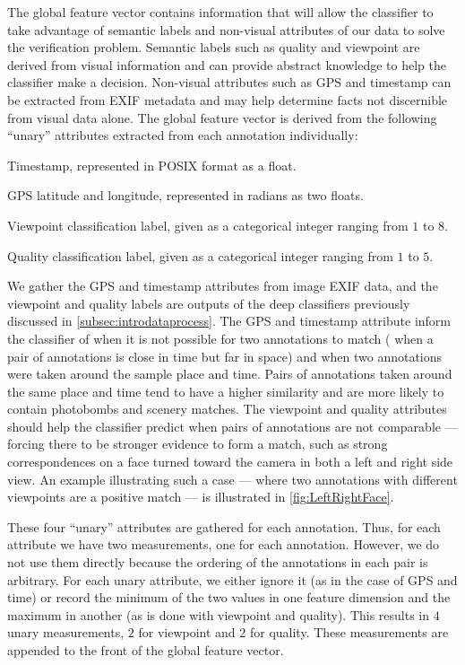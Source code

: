 The global feature vector contains information that will allow the classifier to take advantage of semantic
  labels and non-visual attributes of our data to solve the verification problem.
Semantic labels such as quality and viewpoint are derived from visual information and can provide abstract
  knowledge to help the classifier make a decision.
Non-visual attributes such as GPS and timestamp can be extracted from EXIF metadata and may help determine facts
  not discernible from visual data alone.
The global feature vector is derived from the following ``unary'' attributes extracted from each annotation individually:
\begin{enumln}

    \item Timestamp, represented in POSIX format as a float.

    \item GPS latitude and longitude, represented in radians as two floats. 

    \item Viewpoint classification label, given as a categorical integer ranging from $1$ to $8$.

    \item Quality classification label, given as a categorical integer ranging from $1$ to $5$.
\end{enumln}
We gather the GPS and timestamp attributes from image EXIF data, and the viewpoint and quality labels are outputs
  of the deep classifiers previously discussed in \cref{subsec:introdataprocess}.
The GPS and timestamp attribute inform the classifier of when it is not possible for two annotations to match
  (\eg{} when a pair of annotations is close in time but far in space) and when two annotations were taken around
  the sample place and time.
Pairs of annotations taken around the same place and time tend to have a higher similarity and are more likely to
  contain photobombs and scenery matches.
The viewpoint and quality attributes should help the classifier predict when pairs of annotations are not
  comparable --- forcing there to be stronger evidence to form a match, such as strong correspondences on a face
  turned toward the camera in both a left and right side view.
An example illustrating such a case --- where two annotations with different viewpoints are a positive match ---
  is illustrated in \cref{fig:LeftRightFace}.

\LeftRightFace{}

These four ``unary'' attributes are gathered for each annotation.
Thus, for each attribute we have two measurements, one for each annotation.
However, we do not use them directly because the ordering of the annotations in each pair is arbitrary.
For each unary attribute, we either ignore it (as in the case of GPS and time) or record the minimum of the two
  values in one feature dimension and the maximum in another (as is done with viewpoint and quality).
This results in $4$ unary measurements, $2$ for viewpoint and $2$ for quality.
These measurements are appended to the front of the global feature vector.

